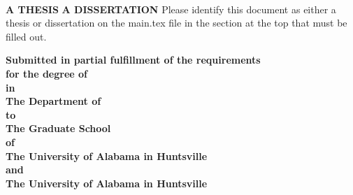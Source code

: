 
\begin{titlepage}
    \begin{center}
        \Large
        \singlespacing
        \textbf{\thesistitle}
        

\vspace{2cm}

        \large
        \textbf{\studentname}\\
        \vspace{1.5cm}
        \normalsize
        \ifdefined\thesis
        \textbf{A THESIS}
        \vspace{1.5cm}
        \else
        \ifdefined\dissertation
        \textbf{A DISSERTATION}
        \vspace{1.5cm}
        \else
        Please identify this document as either a thesis or dissertation on the main.tex file in the section at the top that must be filled out.
        \vspace{1.5cm}
        \fi
        \fi

        \textbf{Submitted in partial fulfillment of the requirements \\for the degree of \degree}\\  
        
\vspace{0.1cm}
  \textbf{in}\\
      \vspace{0.1cm}
        \textbf{The Department of \department}\\
        \vspace{0.1cm}
  \textbf{to}\\
\vspace{0.1cm}
\textbf{The Graduate School}\\
\vspace{0.1cm}
\textbf{of}\\
\vspace{0.1cm}
        \ifdefined\jointuni
        \textbf{The University of Alabama in Huntsville\\ and\\  \jointuni}
        \else
        \textbf{The University of Alabama in Huntsville}
    \fi

        
        \vspace{0.4cm}
        \textbf{\gradmonth\ \gradyear}
        



\end{center}
\end{titlepage}
